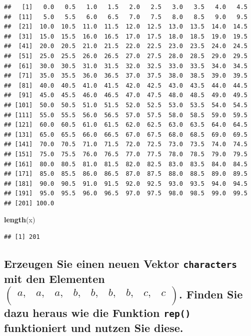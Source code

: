 \documentclass[12pt,a4paper]{article}
\newenvironment{Shaded}{\begin{snugshade}}{\end{snugshade}}
\newcommand{\FunctionTok}[1]{\textcolor[rgb]{0.13,0.29,0.53}{\textbf{#1}}}
\newcommand{\NormalTok}[1]{#1}
\begin{document}
\begin{verbatim}
##   [1]   0.0   0.5   1.0   1.5   2.0   2.5   3.0   3.5   4.0   4.5
##  [11]   5.0   5.5   6.0   6.5   7.0   7.5   8.0   8.5   9.0   9.5
##  [21]  10.0  10.5  11.0  11.5  12.0  12.5  13.0  13.5  14.0  14.5
##  [31]  15.0  15.5  16.0  16.5  17.0  17.5  18.0  18.5  19.0  19.5
##  [41]  20.0  20.5  21.0  21.5  22.0  22.5  23.0  23.5  24.0  24.5
##  [51]  25.0  25.5  26.0  26.5  27.0  27.5  28.0  28.5  29.0  29.5
##  [61]  30.0  30.5  31.0  31.5  32.0  32.5  33.0  33.5  34.0  34.5
##  [71]  35.0  35.5  36.0  36.5  37.0  37.5  38.0  38.5  39.0  39.5
##  [81]  40.0  40.5  41.0  41.5  42.0  42.5  43.0  43.5  44.0  44.5
##  [91]  45.0  45.5  46.0  46.5  47.0  47.5  48.0  48.5  49.0  49.5
## [101]  50.0  50.5  51.0  51.5  52.0  52.5  53.0  53.5  54.0  54.5
## [111]  55.0  55.5  56.0  56.5  57.0  57.5  58.0  58.5  59.0  59.5
## [121]  60.0  60.5  61.0  61.5  62.0  62.5  63.0  63.5  64.0  64.5
## [131]  65.0  65.5  66.0  66.5  67.0  67.5  68.0  68.5  69.0  69.5
## [141]  70.0  70.5  71.0  71.5  72.0  72.5  73.0  73.5  74.0  74.5
## [151]  75.0  75.5  76.0  76.5  77.0  77.5  78.0  78.5  79.0  79.5
## [161]  80.0  80.5  81.0  81.5  82.0  82.5  83.0  83.5  84.0  84.5
## [171]  85.0  85.5  86.0  86.5  87.0  87.5  88.0  88.5  89.0  89.5
## [181]  90.0  90.5  91.0  91.5  92.0  92.5  93.0  93.5  94.0  94.5
## [191]  95.0  95.5  96.0  96.5  97.0  97.5  98.0  98.5  99.0  99.5
## [201] 100.0
\end{verbatim}

\begin{Shaded}
\begin{Highlighting}[]
    \FunctionTok{length}\NormalTok{(x)}
\end{Highlighting}
\end{Shaded}

\begin{verbatim}
## [1] 201
\end{verbatim}

\vspace{0.5cm}

\subsection{\texorpdfstring{Erzeugen Sie einen neuen Vektor
\texttt{characters} mit den Elementen
\(\begin{pmatrix} a, & a, & a,  & b, & b, & b, & b, & c, & c \\ \end{pmatrix}\).
Finden Sie dazu heraus wie die Funktion \texttt{rep()} funktioniert und
nutzen Sie
diese.}{Erzeugen Sie einen neuen Vektor  mit den Elementen \textbackslash begin\{pmatrix\} a, \& a, \& a,  \& b, \& b, \& b, \& b, \& c, \& c \textbackslash\textbackslash{} \textbackslash end\{pmatrix\}. Finden Sie dazu heraus wie die Funktion  funktioniert und nutzen Sie diese.}}\label{erzeugen-sie-einen-neuen-vektor-mit-den-elementen-beginpmatrix-a-a-a-b-b-b-b-c-c-endpmatrix.-finden-sie-dazu-heraus-wie-die-funktion-funktioniert-und-nutzen-sie-diese.}
\end{document}
